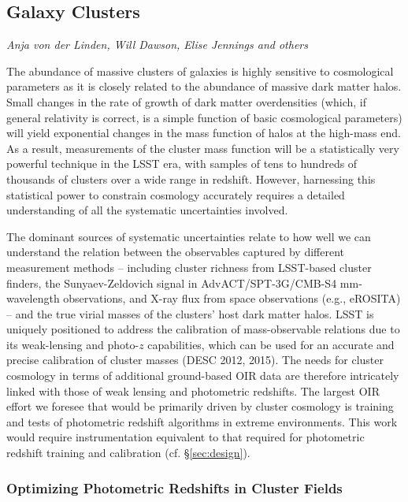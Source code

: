 
\subsection{Galaxy Clusters}
\label{sec:clusters}
{\it Anja von der Linden, Will Dawson, Elise Jennings and others}

The abundance of massive clusters of galaxies is highly sensitive to cosmological parameters as it is closely related to the abundance of massive dark matter halos.  Small changes in the rate of growth of dark matter overdensities (which, if general relativity is correct, is a simple function of basic cosmological parameters) will yield exponential changes in the mass function of halos at the high-mass end.  As a result, measurements of the cluster mass function will be a statistically very powerful technique in the LSST era, with samples of tens to hundreds of thousands of clusters over a wide range in redshift.  However, harnessing this statistical power to constrain cosmology accurately requires a detailed understanding of all the systematic uncertainties involved.  

The dominant sources of systematic uncertainties relate to how well we can understand the relation between the observables captured by different measurement methods -- including cluster richness from LSST-based cluster finders, the Sunyaev-Zeldovich signal in AdvACT/SPT-3G/CMB-S4 mm-wavelength observations, and X-ray flux from space observations (e.g., eROSITA) -- and the true virial masses of the clusters' host dark matter halos.  LSST is uniquely positioned to address the calibration of mass-observable relations due to its weak-lensing and photo-$z$ capabilities, which can be used for an accurate and precise calibration of cluster masses (DESC 2012, 2015).  The needs for cluster cosmology in terms of additional ground-based OIR data are therefore intricately linked with those of weak lensing and photometric redshifts.  The largest OIR effort we foresee that would be primarily driven by cluster cosmology is training and tests of photometric redshift algorithms in extreme environments.  This work would require instrumentation equivalent to that required for photometric redshift training and calibration (cf. \S \ref{sec:design}).


\subsubsection{Optimizing Photometric Redshifts in Cluster Fields}
\label{sub:cluster_photz}

